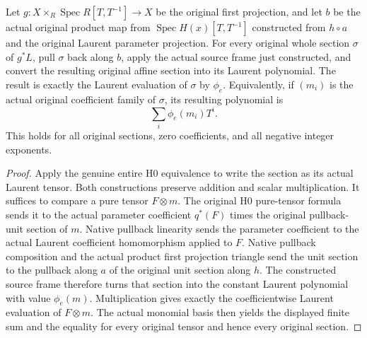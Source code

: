 \begin{theorem}\label{thm:fc-point-laurent-line-evaluation}
\leanok
{}
Let $g:X\times_R\operatorname{Spec}R[T,T^{-1}]\to X$ be the original
first projection, and let $b$ be the actual original product map from
$\operatorname{Spec}H(x)[T,T^{-1}]$ constructed from $h\circ a$ and
the original Laurent parameter projection. For every original whole
section $\sigma$ of $g^*L$, pull $\sigma$ back along $b$, apply the
actual source frame just constructed, and convert the resulting
original affine section into its Laurent polynomial. The result is
exactly the Laurent evaluation of $\sigma$ by $\phi_e$. Equivalently,
if $(m_i)$ is the actual original coefficient family of $\sigma$,
its resulting polynomial is
\[
 \sum_i \phi_e(m_i)T^i.
\]
This holds for all original sections, zero coefficients, and all
negative integer exponents.
\end{theorem}
\begin{proof}
Apply the genuine entire H0 equivalence to write the section as its
actual Laurent tensor. Both constructions preserve addition and
scalar multiplication. It suffices to compare a pure tensor
$F\otimes m$. The original H0 pure-tensor formula sends it to the
actual parameter coefficient $q^*(F)$ times the original pullback-unit
section of $m$. Native pullback linearity sends the parameter
coefficient to the actual Laurent coefficient homomorphism applied
to $F$. Native pullback composition and the actual product first
projection triangle send the unit section to the pullback along
$a$ of the original unit section along $h$. The constructed source
frame therefore turns that section into the constant Laurent
polynomial with value $\phi_e(m)$. Multiplication gives exactly the
coefficientwise Laurent evaluation of $F\otimes m$. The actual
monomial basis then yields the displayed finite sum and the equality
for every original tensor and hence every original section.
\end{proof}

